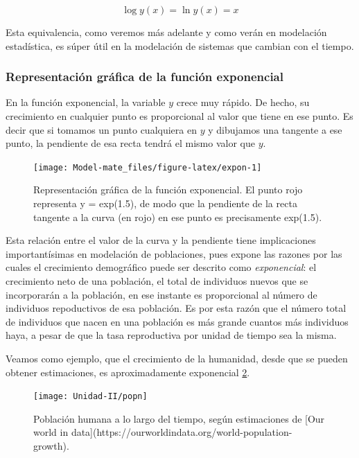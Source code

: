 \documentclass[
]{book}
\begin{document}
\[\log y(x) = \ln y(x) = x\]

Esta equivalencia, como veremos más adelante y como verán en modelación estadística, es súper útil en la modelación de sistemas que cambian con el tiempo.

\hypertarget{representaciuxf3n-gruxe1fica-de-la-funciuxf3n-exponencial}{%
\subsubsection{Representación gráfica de la función exponencial}\label{representaciuxf3n-gruxe1fica-de-la-funciuxf3n-exponencial}}

En la función exponencial, la variable \(y\) crece muy rápido. De hecho, su crecimiento en cualquier punto es proporcional al valor que tiene en ese punto. Es decir que si tomamos un punto cualquiera en \(y\) y dibujamos una tangente a ese punto, la pendiente de esa recta tendrá el mismo valor que \(y\).

\begin{figure}

{\centering \texttt{[image: Model-mate\_files/figure-latex/expon-1]} 

}

\caption{Representación gráfica de la función exponencial. El punto rojo representa y = exp(1.5), de modo que la pendiente de la recta tangente a la curva (en rojo) en ese punto es precisamente exp(1.5).}\label{fig:expon}
\end{figure}

Esta relación entre el valor de la curva y la pendiente tiene implicaciones importantísimas en modelación de poblaciones, pues expone las razones por las cuales el crecimiento demográfico puede ser descrito como \emph{exponencial}: el crecimiento neto de una población, el total de individuos nuevos que se incorporarán a la población, en ese instante es proporcional al número de individuos repoductivos de esa población. Es por esta razón que el número total de individuos que nacen en una población es más grande cuantos más individuos haya, a pesar de que la tasa reproductiva por unidad de tiempo sea la misma.

Veamos como ejemplo, que el crecimiento de la humanidad, desde que se pueden obtener estimaciones, es aproximadamente exponencial \ref{fig:popn-wd}.

\begin{figure}

{\centering \texttt{[image: Unidad-II/popn]} 

}

\caption{Población humana a lo largo del tiempo, según estimaciones de [Our world in data](https://ourworldindata.org/world-population-growth).}\label{fig:popn-wd}
\end{figure}
\end{document}
